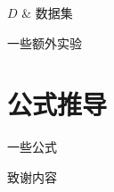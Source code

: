 \documentclass[type=master]{fduthesis}
\begin{document}
\begin{notation}[ll]
  $D$                  & 数据集        \\

\end{notation}

\mainmatter

%   
%   
%   








\appendix
一些额外实验


\chapter{公式推导}
一些公式


\backmatter

\printbibliography

\begin{acknowledgements}
  致谢内容
\end{acknowledgements}
\end{document}
